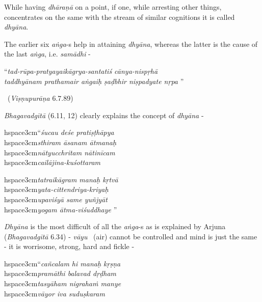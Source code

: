 While having \textit{dhāraṇā} on a point, if one, while arresting other things, concentrates on the same with the stream of similar cognitions it is called \textit{dhyāna}.

The earlier six \textit{aṅga}-s help in attaining \textit{dhyāna}, whereas the latter is the cause of the last \textit{aṅga}, i.e. \textit{samādhi} -

\begin{myquote}
“\textit{tad-rūpa-pratyayaikāgrya-santatiś cānya-nispṛhā }\\\textit{taddhyānam prathamair aṅgaiḥ ṣaḍbhir niṣpadyate nṛpa} ” 

~\hfill (\textit{Viṣṇupurāṇa} 6.7.89)
\end{myquote}

\textit{Bhagavadgītā} (6.11, 12) clearly explains the concept of \textit{dhyāna} -

\begin{myquote}
hspace{3cm}“\textit{śucau deśe pratiṣṭhāpya}\\hspace{3cm}\textit{sthiram āsanam ātmanaḥ }\\hspace{3cm}\textit{nātyucchritam nātinīcam}\\hspace{3cm}\textit{cailājina-kuśottaram }
\end{myquote}

\begin{myquote}
hspace{3cm}\textit{tatraikāgram manaḥ kṛtvā}\\hspace{3cm}\textit{yata-cittendriya-kriyaḥ }\\hspace{3cm}\textit{upaviśyā same yuñjyāt}\\hspace{3cm}\textit{yogam ātma-viśuddhaye} ”
\end{myquote}

\textit{Dhyāna} is the most difficult of all the \textit{aṅga}-s as is explained by Arjuna (\textit{Bhagavadgītā} 6.34) - \textit{vāyu}  (air) cannot be controlled and mind is just the same - it is worrisome, strong, hard and fickle -

\begin{myquote}
hspace{3cm}“\textit{cañcalam hi manaḥ kṛṣṇa}\\hspace{3cm}\textit{pramāthi balavad dṛḍham }\\hspace{3cm}\textit{tasyāham nigrahaṁ manye}\\hspace{3cm}\textit{vāyor iva suduṣkaram} 
\end{myquote}


